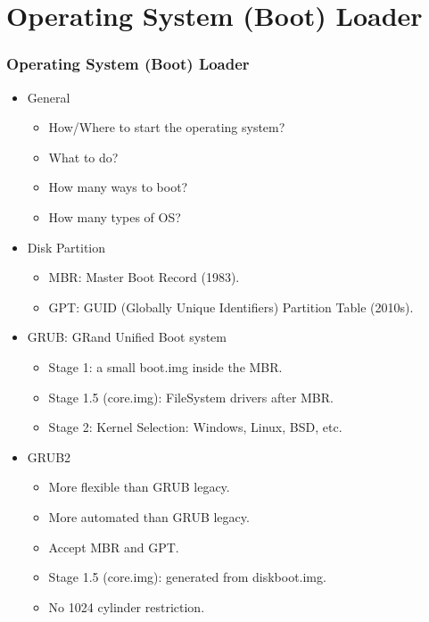 \documentclass[xcolor=table, notheorems, hyperref={pdfpagelabels=false}]{beamer}
\begin{document}
\section{Operating System (Boot) Loader}
\begin{frame}
\frametitle{Operating System (Boot) Loader}
\begin{itemize}
\item General
\begin{itemize}
\item How/Where to start the operating system?
\item What to do?
\item How many ways to boot?
\item How many types of OS?
\end{itemize}
\item Disk Partition
\begin{itemize}
\item MBR: Master Boot Record (1983).
\item GPT: GUID (Globally Unique Identifiers) Partition Table (2010s).
\end{itemize}
\item GRUB: GRand Unified Boot system
\begin{itemize}
\item Stage 1: a small boot.img inside the MBR.
\item Stage 1.5 (core.img): FileSystem drivers after MBR.
\item Stage 2: Kernel Selection: Windows, Linux, BSD, etc. 
\end{itemize}
\item GRUB2
\begin{itemize}
\item More flexible than GRUB legacy.
\item More automated than GRUB legacy.
\item Accept MBR and GPT.
\item Stage 1.5 (core.img): generated from diskboot.img.
\item No 1024 cylinder restriction.
\end{itemize}
\end{itemize}
\end{frame}

\end{document}
